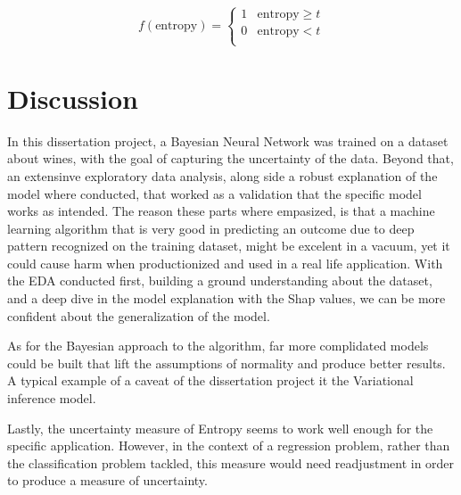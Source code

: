 \documentclass[11pt,twoside]{article}
\numberwithin{Theorem}{section}
\numberwithin{Definition}{section}
\numberwithin{Lemma}{section}
\numberwithin{Algorithm}{section}
\numberwithin{equation}{section}
\begin{document}
\[ 
f(\text{entropy})= \left\{
\begin{array}{ll}
      1 & \text{entropy} \geq t \\
      0 & \text{entropy} < t\\
\end{array} 
\right. 
\]

\cleardoublepage

\section{Discussion}
In this dissertation project, a Bayesian Neural Network was trained on a dataset about wines, with the goal of capturing the uncertainty of the data. Beyond that, an extensinve exploratory data analysis, along side a robust explanation of the model where conducted, that worked as a validation that the specific model works as intended. The reason these parts where empasized, is that a machine learning algorithm that is very good in predicting an outcome due to deep pattern recognized on the training dataset, might be excelent in a vacuum, yet it could cause harm when productionized and used in a real life application. With the EDA conducted first, building a ground understanding about the dataset, and a deep dive in the model explanation with the Shap values, we can be more confident about the generalization of the model. 

As for the Bayesian approach to the algorithm, far more complidated models could be built that lift the assumptions of normality and produce better results. A typical example of a caveat of the dissertation project it the Variational inference model.

Lastly, the uncertainty measure of Entropy seems to work well enough for the specific application. However, in the context of a regression problem, rather than the classification problem tackled, this measure would need readjustment in order to produce a measure of uncertainty.

\clearpage



\clearpage



\end{document}
